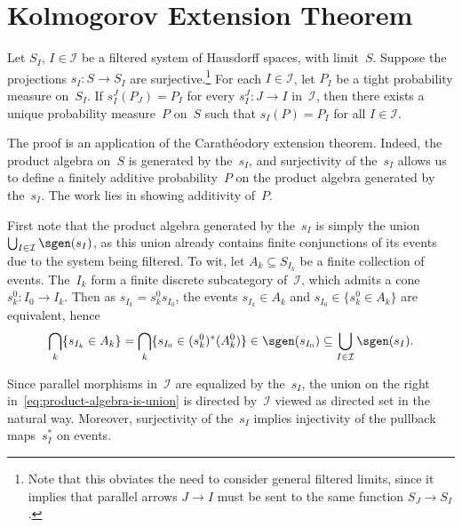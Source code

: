 \chapter	{Kolmogorov Extension Theorem}

\begin	{theorem}	
Let $S_I$, \( I \in \mathcal I \) be a filtered system of Hausdorff spaces,
with limit~$S$.
Suppose the projections \( s_I \colon S \to S_I \) are surjective.\footnote
	{Note that this obviates the need to consider general
	filtered limits,
	since it implies that parallel arrows \( J \to I \)
	must be sent to the same function \( S_J \to S_I \).}
For each \( I \in \mathcal I \), let $P_I$ be a tight probability measure
on~$S_I$.
If \( s_I^J(P_J) = P_I \) for every \( s_I^J \colon J \to I \) in~$\mathcal I$,
then there exists a unique probability measure~$P$ on~$S$ such that
\( s_I(P) = P_I \) for all \( I \in \mathcal I \).
\end	{theorem}
The proof is an application of the Carathéodory extension theorem.
Indeed, the product \sig algebra on~$S$ is generated by the~$s_I$,
and surjectivity of the~$s_I$ allows us to define a finitely additive
probability~$P$ on the product algebra generated by the~$s_I$.
The work lies in showing \sig additivity of~$P$.

First note that the product algebra generated by the~$s_I$
is simply the union
\( \bigcup_{I \in \mathcal I} \sgen(s_I) \),
as this union already contains finite conjunctions of its events
due to the system being filtered.
To wit, let \( A_k \subseteq S_{I_k} \) be a finite collection of events.
The~$I_k$ form a finite discrete subcategory of~$\mathcal I$,
which admits a cone \( s_k^0 \colon I_0 \to I_k \).
Then as \( s_{I_k} = s_k^0 s_{I_0} \),
the events \( s_{I_k} \in A_k \) and \( s_{I_0} \in \{s_k^0 \in A_k\} \)
are equivalent, hence
\begin	{equation}
\label	{eq:product-algebra-is-union}
	\bigcap_k \{s_{I_k} \in A_k\}
		= \bigcap_k \{s_{I_0} \in (s_k^0)^*(A_k^0)\}
		\in \sgen(s_{I_0})
		\subseteq \bigcup_{I \in \mathcal I} \sgen(s_I)
	\text.
\end	{equation}

Since parallel morphisms in~$\mathcal I$ are equalized by the~$s_I$,
the union on the right in~\eqref{eq:product-algebra-is-union}
is directed by~$\mathcal I$ viewed as directed set in the natural way.
Moreover, surjectivity of the~$s_I$ implies injectivity
of the pullback maps~$s_I^*$ on events.

